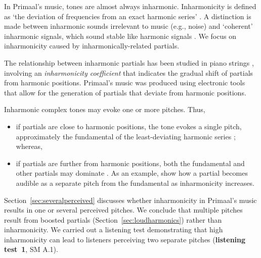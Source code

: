 \documentclass{article}
\begin{document}
In Primaal's music, tones are almost always inharmonic. Inharmonicity is defined as `the deviation of frequencies from an exact harmonic series' \citep{campbell2001inharmonicity}. A distinction is made between inharmonic sounds irrelevant to music (e.g., noise) and `coherent' inharmonic signals, which sound stable like harmonic signals \citep{deboer1956pitch}. We focus on inharmonicity caused by inharmonically-related partials.


The relationship between inharmonic partials has been studied in piano strings \citep{young1952inharmonicity}, involving an \emph{inharmonicity coefficient} that indicates the gradual shift of partials from harmonic positions. 
Primaal's music was produced using electronic tools that allow for the generation of partials that deviate from harmonic positions.

Inharmonic complex tones may evoke one or more pitches. Thus,

\begin{itemize}[noitemsep]
\item if partials are close to harmonic positions, the tone evokes a single pitch, approximately the fundamental of the least-deviating harmonic series \citep[p.~9]{rasch1982perception}; whereas,

\item if partials are further from harmonic positions, both the fundamental and other partials may dominate \citep{jarvelainen2000effect}. As an example, \citet[p.~41]{bregman1996demonstrations} show how a partial becomes audible as a separate pitch from the fundamental as inharmonicity increases. %
\end{itemize}

Section~\ref{sec:severalperceived} discusses whether inharmonicity in Primaal's music results in one or several perceived pitches. We conclude that multiple pitches result from boosted partials (Section~\ref{sec:loudharmonics}) rather than inharmonicity. We carried out a listening test demonstrating that high inharmonicity can lead to listeners perceiving two separate pitches (\textbf{listening test~1}, SM A.1). 

\end{document}
